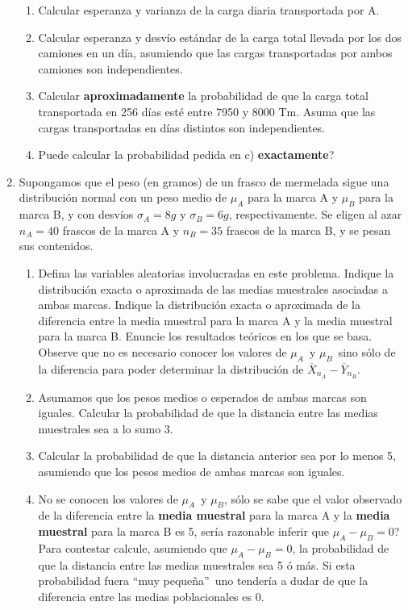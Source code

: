 \documentclass[a4paper, 11pt]{article}
\begin{document}
\begin{enumerate}
\begin{enumerate}
\item Calcular esperanza y varianza de la carga diaria transportada por A.


\item Calcular esperanza y desvío estándar de la carga total llevada
por los dos camiones en un día, asumiendo que las cargas transportadas
por ambos camiones son independientes.


\item Calcular \textbf{aproximadamente} la probabilidad de que la carga total
transportada en 256 días esté entre 7950 y 8000 Tm.  Asuma que las
cargas transportadas en días distintos son independientes.


\item \textquestiondown Puede calcular la probabilidad pedida en c)
\textbf{exactamente}?
\end{enumerate}


\item Supongamos que el peso (en gramos) de un frasco de mermelada sigue una
distribución normal con un peso medio de $\mu_{A}$ para la marca A y
$\mu_{B}$ para la marca B, y con desvíos $\sigma_{A}=8g$ y $\sigma
_{B}=6g$, respectivamente. Se eligen al azar $n_{A}=40$ frascos de la marca A
y $n_{B}=35$ frascos de la marca B, y se pesan sus contenidos.


\begin{enumerate}
\item \label{9a} Defina las variables aleatorias involucradas en este problema. Indique
la distribución exacta o aproximada de las medias muestrales asociadas a
ambas marcas. Indique la distribución exacta o aproximada de la diferencia
entre la media muestral para la marca A y la media muestral para la marca B.
Enuncie los resultados teóricos en los que se basa. Observe que no es
necesario conocer los valores de $\mu_{A}$\ y $\mu_{B}$\ sino sólo de la
diferencia para poder determinar la distribución de $\overline{X}_{n_{A}%
}-\overline{Y}_{n_{B}}.$


\item Asumamos que los pesos medios o esperados de ambas marcas son iguales.
Calcular la probabilidad de que la distancia entre las medias muestrales sea a
lo sumo 3. 


\item Calcular la probabilidad de que la distancia anterior sea por lo menos 5,
asumiendo que los pesos medios de ambas marcas son iguales.


\item No se conocen los valores de $\mu_{A}$\ y $\mu_{B}$, sólo se sabe
que el valor observado de la diferencia entre la \textbf{media muestral} para
la marca A y la \textbf{media muestral} para la marca B es 5,
\textquestiondown sería razonable inferir que $\mu_{A}-\mu_{B}=0$? Para
contestar calcule, asumiendo que $\mu_{A}-\mu_{B}=0$, la probabilidad de que
la distancia entre las medias muestrales sea 5 ó más. Si esta
probabilidad fuera \textquotedblleft muy peque\~{n}a\textquotedblright\ uno
tendería a dudar de que la diferencia entre las medias poblacionales es 0.



\end{enumerate}
\end{enumerate}
\end{document}
